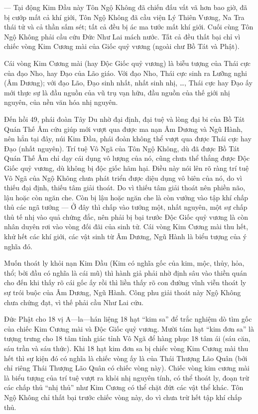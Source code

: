 — Tại động Kim Đầu này Tôn Ngộ Không đã chiến đấu vất vã hơn bao giờ, đã bị cướp mất cả khí giới, Tôn Ngộ Không đã cầu viện Lý Thiên Vương, Na Tra thái tử và cả thần sấm sét; tất cả đều bị ác ma tước mất khí giới. Cuối cùng Tôn Ngộ Không phải cầu cứu Đức Như Lai mách nước. Tất cả đều thất bại chỉ vì chiếc vòng Kim Cương mài của Giốc quỷ vương (ngoài chư Bồ Tát và Phật).

Cái vòng Kim Cương mài (hay Độc Giốc quỷ vương) là biễu tượng của Thái cực của đạo Nho, hay Đạo của Lão giáo. Với đạo Nho, Thái cực sinh ra Lưỡng nghi (Âm Dương); với đạo Lão, Đạo sinh nhất, nhất sinh nhị, \ldots, Thái cực hay Đạo ấy mới thực sự là đầu nguồn của vũ trụ vạn hữu, đầu nguồn của thế giới nhị nguyên, của nền văn hóa nhị nguyên.

Đến hồi 49, phái đoàn Tây Du nhờ đại định, đại tuệ và lòng đại bi của Bồ Tát Quán Thế Âm cứu giúp mới vượt qua được ma nạn Âm Dương và Ngũ Hành, nên hẳn tại đây, núi Kim Đầu, phái đoàn không thể vượt qua được Thái cực hay Đạo (nhất nguyên). Trí tuệ Vô Ngã của Tôn Ngộ Không, dù đã được Bồ Tát Quán Thế Âm chỉ dạy cái dụng vô lượng của nó, cũng chưa thể thắng được Độc Giốc quỷ vương, dù không bị độc giốc hãm hại. Điều này nói lên rõ ràng trí tuệ Vô Ngã của Ngộ Không chưa phát triển được diệu dụng vô biên của nó, do vì thiếu đại định, thiếu tâm giải thoát. Do vì thiếu tâm giải thoát nên phiền não, lậu hoặc còn ngăn che. Còn bị lậu hoặc ngăn che là còn vướng vào tập khí chấp thủ các ngã tướng — Ở đây thì chấp vào tướng một, nhất nguyên, một sự chấp thủ tế nhị vào quả chứng đắc, nên phải bị bại trước Độc Giốc quỷ vương là còn nhân duyên rơi vào vòng đối đãi của sinh tử. Cái vòng Kim Cương mài thu hết, khử hết các khí giới, các vật sinh từ Âm Dương, Ngũ Hành là biểu tượng của ý nghĩa đó.

Muốn thoát ly khỏi nạn Kim Đầu (Kim có nghĩa gốc của kim, mộc, thủy, hỏa, thổ; bởi đầu có nghĩa là cái mũ) thì hành giả phải nhờ định sâu vào thiền quán cho đến khi thấy rõ cái gốc ấy rồi thì liền thấy rõ con đường vĩnh viễn thoát ly sự trói buộc của Âm Dương, Ngũ Hành. Công phu giải thoát này Ngộ Không chưa chứng đạt, vì thế phải cầu Như Lai cứu.

Đức Phật cho 18 vị A—la—hán liệng 18 hạt ``kim sa'' để trắc nghiệm dò tìm gốc của chiếc Kim Cương mài và Độc Giốc quỷ vương. Mười tám hạt ``kim đơn sa'' là tượng trưng cho 18 tâm tỉnh giác tỉnh Vô Ngã để hàng phục 18 tâm ái (sáu căn, sáu trần và sáu thức). Khi 18 hạt kim đơn sa bị chiếc vòng Kim Cương mài thu hết thì sự kiện đó có nghĩa là chiếc vòng ấy là của Thái Thượng Lão Quân (bởi chỉ riêng Thái Thượng Lão Quân có chiếc vòng này). Chiếc vòng kim cương mài là biểu tượng của trí tuệ vượt ra khỏi nhị nguyên tính, có thể thoát ly, đoạn trừ các chấp thủ ``nhị thủ'' như Kim Cương có thể chặt đứt các vật thể khác. Tôn Ngộ Không chỉ thất bại trước chiếc vòng này, do vì chưa trừ hết tập khí chấp thủ.

